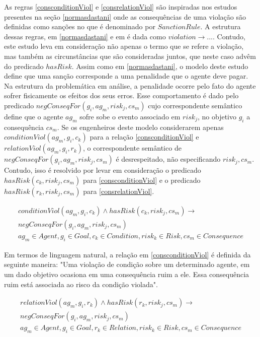 As regras \ref{consconditionViol} e \ref{consrelationViol} são inspiradas nos estudos presentes na seção \ref{normasdastani} onde as consequências de uma violação são definidas como sanções no que é denominado por $Sanction Rule$. A estrutura dessas regras, em \ref{normasdastani} e em \cite{dastaniframework} é dada como $violation \to ... $. Contudo, este estudo leva em consideração não apenas o termo que se refere a violação, mas também as circunstâncias que são consideradas juntos, que neste caso advêm do predicado $hasRisk$. Assim como em \ref{normasdastani}, o modelo deste estudo define que uma sanção corresponde a uma penalidade que o agente deve pagar. Na estrutura da problemática em análise, a penalidade ocorre pelo fato do agente sofrer fisicamente os efeitos dos seus erros. Esse comportamento é dado pelo predicado $negConseqFor(g_i,ag_m,risk_j,cs_m)$ cujo correspondente semântico define que o agente $ag_m$ sofre sobe o evento associado em $risk_j$, no objetivo $g_i$ a consequência $cs_m$. Se os engenheiros deste modelo considerarem apenas $conditionViol(ag_m,g_i,c_k)$ para a relação \ref{consconditionViol} e $relationViol(ag_m,g_i,r_k)$, o correspondente semântico de $negConseqFor(g_i,ag_m,risk_j,cs_m)$ é desrespeitado, não especificando $risk_j,cs_m$. Contudo, isso é resolvido por levar em consideração o predicado $hasRisk(c_k,risk_j,cs_m)$ para \ref{consconditionViol} e o predicado $hasRisk(r_k,risk_j,cs_m)$ para \ref{consrelationViol}. 

\begin{eqnarray}\label{consconditionViol}\nonumber
	conditionViol(ag_m,g_i,c_k)  \wedge hasRisk(c_k,risk_j,cs_m) \to \nonumber \\ 
	negConseqFor(g_i,ag_m,risk_j,cs_m) \nonumber \\ 
    ag_m \in Agent, g_i \in Goal, c_k \in Condition, risk_k \in Risk, cs_m \in Consequence
\end{eqnarray}

Em termos de linguagem natural, a relação em \ref{consconditionViol} é definida da seguinte maneira: "Uma violação de condição sobre um determinado agente, em um dado objetivo ocasiona em uma consequência ruim a ele. Essa consequência ruim está associada ao risco da condição violada". 

\begin{eqnarray}\label{consrelationViol}\nonumber
	relationViol(ag_m,g_i,r_k) \wedge hasRisk(r_k,risk_j,cs_m) \to \\ 
	negConseqFor(g_i,ag_m,risk_j,cs_m) \nonumber \\ 
    ag_m \in Agent, g_i \in Goal, r_k \in Relation, risk_k \in Risk, cs_m \in Consequence 
\end{eqnarray}

